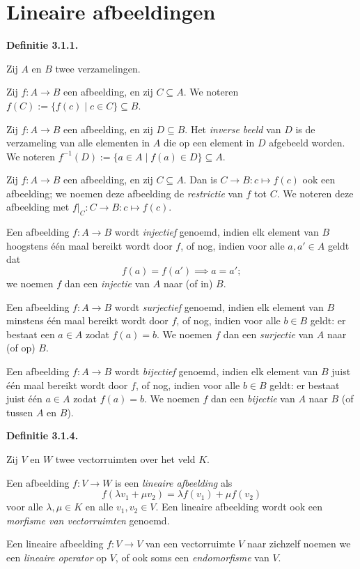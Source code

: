 \documentclass[10pt,a4paper]{article}
\newenvironment{res}[1]{%
  \par\noindent\textbf{Definitie #1.}~\ignorespaces
}{%
  \par\vspace{2pt}\normalfont
}
\begin{document}
\section{Lineaire afbeeldingen}

\begin{res}{3.1.1}
Zij $A$ en $B$ twee verzamelingen.
\begin{myenum}
\item Zij $f:A\to B$ een afbeelding, en zij $C\subseteq A$. We noteren $f(C):=\{f(c)\mid c\in C\}\subseteq B$.
\item Zij $f:A\to B$ een afbeelding, en zij $D\subseteq B$. Het \textit{inverse beeld} van $D$ is de verzameling van alle elementen in $A$ die op een element in $D$ afgebeeld worden. We noteren $f^{-1}(D):=\{a\in A\mid f(a)\in D\}\subseteq A$.
\item Zij $f:A\to B$ een afbeelding, en zij $C\subseteq A$. Dan is $C\to B:c\mapsto f(c)$ ook een afbeelding; we noemen deze afbeelding de \textit{restrictie} van $f$ tot $C$. We noteren deze afbeelding met $f|_C:C\to B:c\mapsto f(c)$.
\item Een afbeelding $f:A\to B$ wordt \textit{injectief} genoemd, indien elk element van $B$ hoogstens \'e\'en maal bereikt wordt door $f$, of nog, indien voor alle $a,a'\in A$ geldt dat
\[
f(a)=f(a') \implies a=a';
\]
we noemen $f$ dan een \textit{injectie} van $A$ naar (of in) $B$.
\item Een afbeelding $f:A\to B$ wordt \textit{surjectief} genoemd, indien elk element van $B$ minstens \'e\'en maal bereikt wordt door $f$, of nog, indien voor alle $b\in B$ geldt: er bestaat een $a\in A$ zodat $f(a)=b$. We noemen $f$ dan een \textit{surjectie} van $A$ naar (of op) $B$.
\item Een afbeelding $f:A\to B$ wordt \textit{bijectief} genoemd, indien elk element van $B$ juist \'e\'en maal bereikt wordt door $f$, of nog, indien voor alle $b\in B$ geldt: er bestaat juist \'e\'en $a\in A$ zodat $f(a)=b$. We noemen $f$ dan een \textit{bijectie} van $A$ naar $B$ (of tussen $A$ en $B$).
\end{myenum}
\end{res}

\begin{res}{3.1.4}
Zij $V$ en $W$ twee vectorruimten over het veld $K$.
\begin{myenum}
\item Een afbeelding $f:V\to W$ is een \textit{lineaire afbeelding} als
\[
f(\lambda v_1+\mu v_2)=\lambda f(v_1)+\mu f(v_2)
\]
voor alle $\lambda,\mu\in K$ en alle $v_1,v_2\in V$. Een lineaire afbeelding wordt ook een \textit{morfisme van vectorruimten} genoemd.
\item Een lineaire afbeelding $f:V\to V$ van een vectorruimte $V$ naar zichzelf noemen we een \textit{lineaire operator} op $V$, of ook soms een \textit{endomorfisme} van $V$.
\end{myenum}
\end{res}
\end{document}
